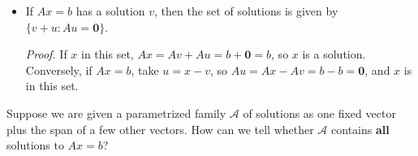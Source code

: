 \documentclass[11pt]{article}
\newcommand{\1}{\mathbf{1}}
\newcommand{\0}{\mathbf{0}}
\newcommand{\A}{\mathcal{A}}
\begin{document}
\begin{itemize}

\item

If $Ax=b$ has a solution $v$,
then the set of solutions is given by $\{v+u: Au=\0\}$.

\emph{Proof.}
If $x$ in this set, $Ax=Av+Au=b+\0=b$, so $x$ is a solution.
Conversely, if $Ax=b$, take $u = x-v$, so $Au=Ax-Av=b-b=\0$, and $x$ is in this set.

\end{itemize}

Suppose we are given a parametrized family $\A$ of solutions as one fixed vector plus the span of a few other vectors. How can we tell whether $\A$ contains \textbf{all} solutions to $Ax=b$?

\end{document}
